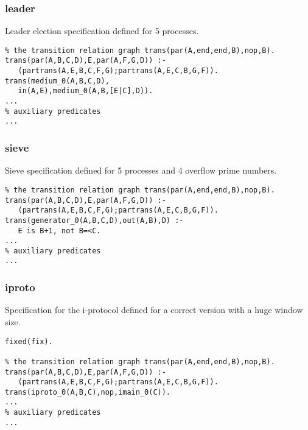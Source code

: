 \subsubsection*{leader}

Leader election specification defined for 5 processes.

\begin{Verbatim}
% the transition relation graph trans(par(A,end,end,B),nop,B).
trans(par(A,B,C,D),E,par(A,F,G,D)) :-
   (partrans(A,E,B,C,F,G);partrans(A,E,C,B,G,F)).
trans(medium_0(A,B,C,D),
   in(A,E),medium_0(A,B,[E|C],D)).
...
% auxiliary predicates
...
\end{Verbatim}

\subsubsection*{sieve}

Sieve specification defined for 5 processes and 4 overflow prime numbers.

\begin{Verbatim}
% the transition relation graph trans(par(A,end,end,B),nop,B).
trans(par(A,B,C,D),E,par(A,F,G,D)) :-
   (partrans(A,E,B,C,F,G);partrans(A,E,C,B,G,F)).
trans(generator_0(A,B,C,D),out(A,B),D) :-
   E is B+1, not B=<C.
...
% auxiliary predicates
...
\end{Verbatim}

\subsubsection*{iproto}

Specification for the i-protocol defined for a correct version with a huge window size.

\begin{Verbatim}
fixed(fix).

% the transition relation graph trans(par(A,end,end,B),nop,B).
trans(par(A,B,C,D),E,par(A,F,G,D)) :-
   (partrans(A,E,B,C,F,G);partrans(A,E,C,B,G,F)). 
trans(iproto_0(A,B,C),nop,imain_0(C)).
...
% auxiliary predicates
...
\end{Verbatim}